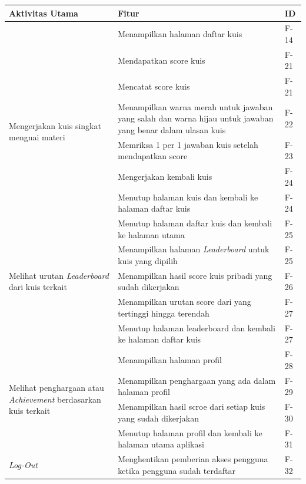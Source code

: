 \newpage
\begin{table}[H]
	\begin{tabular}{|m{3cm}|p{}|p{1cm}|}
		\hline
		\centering\textbf{Aktivitas Utama} & \centering\textbf{Fitur} & \multicolumn{1}{m{1cm}|}{\centering \textbf{ID}} \\
		\hline
		\multirow{8}{2.5cm}{Mengerjakan kuis singkat mengnai materi} &Menampilkan halaman daftar kuis& F-14 \\
		\cline{2-3}
		&Mendapatkan score kuis& F-21 \\
		\cline{2-3}
		&Mencatat score kuis& F-21 \\
		\cline{2-3}
		&Menampilkan warna merah untuk jawaban yang salah dan warna hijau untuk jawaban yang benar dalam ulasan kuis& F-22 \\
		\cline{2-3}
		&Memriksa 1 per 1 jawaban kuis setelah mendapatkan score& F-23 \\
		\cline{2-3}
		&Mengerjakan kembali kuis& F-24 \\
		\cline{2-3}
		&Menutup halaman kuis dan kembali ke halaman daftar kuis& F-24 \\
		\cline{2-3}
		&Menutup halaman daftar kuis dan kembali ke halaman utama& F-25 \\
		\hline
		\multirow{3}{3cm}{Melihat urutan \textit{Leaderboard} dari kuis terkait} &Menampilkan halaman \textit{Leaderboard} untuk kuis yang dipilih & F-25 \\
		\cline{2-3}
		&Menampilkan hasil score kuis pribadi yang sudah dikerjakan& F-26 \\
		\cline{2-3}
		&Menampilkan urutan score dari yang tertinggi hingga terendah& F-27 \\
		\cline{2-3}
		&Menutup halaman leaderboard dan kembali ke halaman daftar kuis& F-27 \\
		\hline
		\multirow{4}{3cm}{Melihat penghargaan atau \textit{Achievement} berdasarkan kuis terkait} &Menampilkan halaman profil& F-28 \\
		\cline{2-3}
		&Menampilkan penghargaan yang ada dalam halaman profil& F-29 \\
		\cline{2-3}
		&Menampilkan hasil scroe dari setiap kuis yang sudah dikerjakan& F-30 \\
		\cline{2-3}
		&Menutup halaman profil dan kembali ke halaman utama aplikasi& F-31 \\
		\hline
		\multirow{1}{2.5cm}{\textit{Log-Out}} &Menghentikan pemberian akses pengguna ketika pengguna sudah terdaftar& F-32 \\
		\hline
	\end{tabular}
\end{table}
